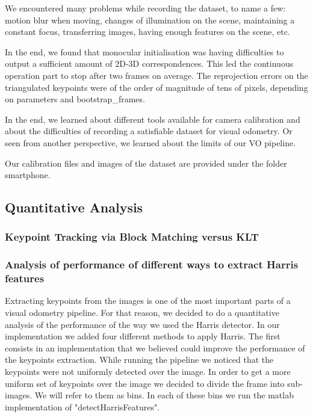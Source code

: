 We encountered many problems while recording the dataset, to name a few: motion blur when moving, changes of illumination on the scene,
maintaining a constant focus, transferring images, having enough features on the scene, etc.

In the end, we found that monocular initialisation was having difficulties to output a sufficient amount of 2D-3D correspondences.
This led the continuous operation part to stop after two frames on average. The reprojection errors on the triangulated keypoints were of
the order of magnitude of tens of pixels, depending on parameters and bootstrap\_frames.

In the end, we learned about different tools available for camera calibration and about the difficulties of recording a satisfiable dataset
for visual odometry. Or seen from another perspective, we learned about the limits of our VO pipeline.

Our calibration files and images of the dataset are provided under the folder smartphone.








\subsection{Quantitative Analysis}
\subsubsection{Keypoint Tracking via Block Matching versus KLT}

\subsubsection{Analysis of performance of different ways to extract Harris features}
Extracting keypoints from the images is one of the most important parts of a visual odometry pipeline. For that reason, we
decided to do a quantitative analysis of the performance of the way we used the Harris detector.
In our implementation we added four different methods to apply Harris.
The first consists in an implementation that we believed could improve the performance of the keypoints extraction.
While running the pipeline we noticed that the keypoints were not uniformly detected over the image.
In order to get a more uniform set of keypoints over the image we decided to divide the frame into sub-images. We will refer to them
as bins. In each of these bins we run the matlab implementation of "detectHarrisFeatures".

